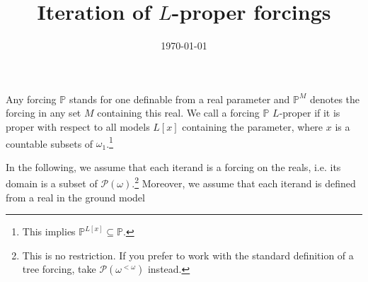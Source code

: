\documentclass[a4paper, 11pt]{amsart}
\date{\today}
\title{Iteration of $L$-proper forcings}
\theoremstyle{remark}
\newcommand{\axiomft}[1]{\mathsf{#1}}
\newcommand{\ZFC}{\axiomft{ZFC}}
\newcommand{\PP}{\mathbb{P}}
\newcommand{\cC}{\mathcal C}
\newcommand{\pow}{\mathcal{P}}
\begin{document}

\maketitle







Any forcing $\PP$ stands for one definable from a real parameter and $\PP^M$ denotes the forcing in any set $M$ containing this real. 
We call a forcing $\PP$ $L$-proper if it is proper with respect to all models $L[x]$ containing the parameter, where $x$ is a countable subsets of $\omega_1$.\footnote{This implies $\PP^{L[x]}\subseteq \PP$.} 


In the following, we assume that each iterand is a forcing on the reals, i.e. its domain is a subset of $\pow(\omega)$.\footnote{This is no restriction. If you prefer to work with the standard definition of a tree forcing, take $\pow(\omega^{<\omega})$ instead.} 
Moreover, we assume that each iterand is defined from a real in the ground model 
\end{document}
